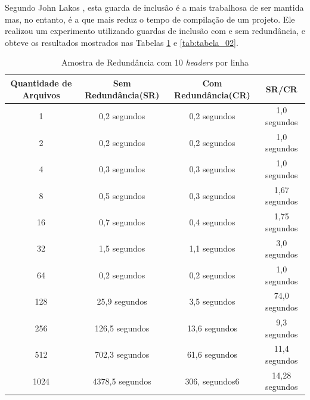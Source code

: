 \begin{enumerate}
Segundo John Lakos \cite[pág. 82]{ref42}, esta guarda de inclusão é a mais trabalhosa de ser mantida
 mas, no entanto, é a que mais reduz o tempo de compilação de um projeto. Ele
 realizou um experimento utilizando guardas de inclusão com e sem redundância,
 e obteve os resultados mostrados nas Tabelas \ref{tab:tabela_01} e 
\ref{tab:tabela_02}.

\begin{table}[!ht]
    \centering
    \caption {Amostra de Redundância com 10 \textit{headers} por linha}
    \label{tab:tabela_01}
    \begin{tiny}
    \begin{tabular}{cccc}
    \toprule
    \textbf{Quantidade de Arquivos} & \textbf{Sem Redundância(SR)} & \textbf{Com Redundância(CR)} &  \textbf{SR/CR} \\
    \midrule
    1 		& 0,2 	 segundos	 & 0,2 	 segundos		& 1,0	 segundos   \\
    2 		& 0,2 	 segundos	 & 0,2 	 segundos		& 1,0	 segundos   \\
    4 		& 0,3 	 segundos	 & 0,3 	 segundos		& 1,0	 segundos   \\
    8 		& 0,5	 segundos	 & 0,3 	 segundos		& 1,67	 segundos   \\
    16 		& 0,7 	 segundos	 & 0,4 	 segundos		& 1,75	 segundos   \\
    32 		& 1,5 	 segundos	 & 1,1 	 segundos		& 3,0	 segundos   \\
    64 		& 0,2 	 segundos	 & 0,2 	 segundos		& 1,0	 segundos   \\
    128		& 25,9	 segundos	 & 3,5 	 segundos		& 74,0	 segundos   \\
    256		& 126,5	 segundos	 & 13,6  segundos		& 9,3	 segundos   \\
    512 	& 702,3	 segundos	 & 61,6  segundos		& 11,4	 segundos   \\
    1024	& 4378,5 segundos     & 306, segundos6 		& 14,28	 segundos   \\
    \bottomrule
    \end{tabular}
    \end{tiny}
\end{table}


\end{enumerate}
